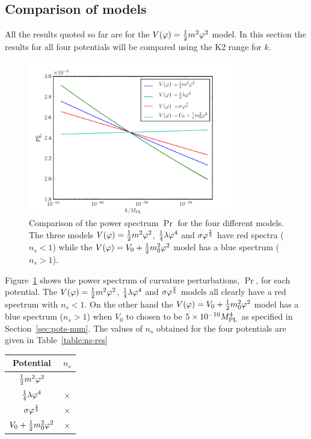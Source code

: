 \subsection{Comparison of models}
\label{sec:compare-res}
All the results quoted so far are for the $V(\varphi)=\frac{1}{2} m^2 \varphi^2$ model. In this section
the results for all four potentials will be compared using the K2 range for $k$. 
% 
% 
\begin{figure}
 \centering
\includegraphics[width=0.8\textwidth]{numerical/graphs/cmp_Pr_allks-large}
\caption[Comparison of $\Pr$ for models]{Comparison of the power spectrum $\Pr$ for
the four different models. The three models $V(\varphi)=\frac{1}{2} m^2 \varphi^2$, $\frac{1}{4}\lambda\varphi^4$ and
$\sigma\varphi^{\frac{2}{3}}$ have red spectra ($n_s <1$) while the $V(\varphi) = V_0 + \frac{1}{2} m_0^2 \varphi^2$
model has a blue spectrum ($n_s>1$).}
\label{fig:cmp-Pr}
\end{figure}
% 
Figure~\ref{fig:cmp-Pr} shows the power spectrum of curvature perturbations, $\Pr$, for each
potential. The $V(\varphi)=\frac{1}{2} m^2 \varphi^2$, $\frac{1}{4}\lambda\varphi^4$ and $\sigma\varphi^{\frac{2}{3}}$ models all clearly have
a red spectrum with $n_s <1$. On the other hand the $V(\varphi)=V_0 + \frac{1}{2} m_0^2 \varphi^2$ model has a blue
spectrum ($n_s>1$) when $V_0$ to chosen to be $5\times 10^{-10}M_{\mathrm{PL}}^4$ as specified in
Section~\ref{sec:pots-num}. 
% 
The values of $n_s$ obtained for the four potentials are given in Table~\ref{table:ns-res}
% 
\begin{center}
\begin{tabular}{|c|c|}
\hline Potential & $n_s$ \\
\hline
$\frac{1}{2} m^2 \varphi^2$ &  \\ 
\hline
$\frac{1}{4}\lambda\varphi^4$ & × \\
\hline 
$\sigma\varphi^{\frac{2}{3}}$ & × \\
\hline 
$V_0 + \frac{1}{2} m_0^2 \varphi^2$ & × \\
\hline
\end{tabular}
\end{center}


